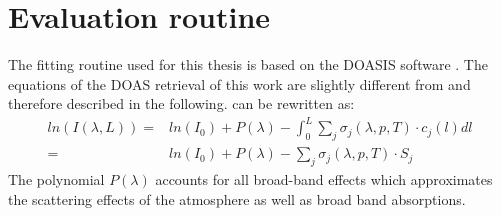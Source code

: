 \documentclass  [
  paper    = a4,
  BCOR     = 10mm,
  twoside,
  fontsize = 12pt,
  fleqn,
  toc      = bibnumbered,
  toc      = listofnumbered,
  numbers  = noendperiod,
  headings = normal,
  listof   = leveldown,
  version  = 3.03
]                                       {scrreprt}
\begin{document}
\section{Evaluation routine}
The fitting routine used for this thesis is based on the DOASIS software \citep{kraus2006doasis}. 
The equations of the DOAS retrieval of this work are slightly different from  and therefore described in the following.
 can be rewritten as:
\begin{align}
ln\left(I\left(\lambda, L\right)\right) = &ln\left(I_0 \right) + P \left(\lambda\right) -    \int_{0}^{L}\sum_{j}\sigma_j \left(\lambda, p, T \right) \cdot c_j \left(l\right)dl \nonumber \\
= &ln\left(I_0 \right) + P \left(\lambda\right)-
\sum_{j}\sigma_j \left(\lambda, p, T \right) \cdot S_j
\label{eq:lben}
\end{align}
%
The polynomial $ P \left(\lambda\right)$ accounts for all broad-band effects which approximates the scattering effects of the atmosphere as well as broad band absorptions.
\end{document}
